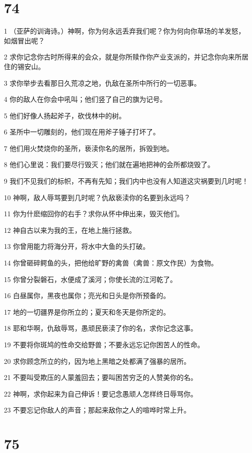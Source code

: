 \chapter{74}

\par 1 （亚萨的训诲诗。）神啊，你为何永远丢弃我们呢？你为何向你草场的羊发怒，如烟冒出呢？
\par 2 求你记念你古时所得来的会众，就是你所赎作你产业支派的，并记念你向来所居住的锡安山。
\par 3 求你举步去看那日久荒凉之地，仇敌在圣所中所行的一切恶事。
\par 4 你的敌人在你会中吼叫；他们竖了自己的旗为记号。
\par 5 他们好像人扬起斧子，砍伐林中的树。
\par 6 圣所中一切雕刻的，他们现在用斧子锤子打坏了。
\par 7 他们用火焚烧你的圣所，亵渎你名的居所，拆毁到地。
\par 8 他们心里说：我们要尽行毁灭；他们就在遍地把神的会所都烧毁了。
\par 9 我们不见我们的标帜，不再有先知；我们内中也没有人知道这灾祸要到几时呢！
\par 10 神啊，敌人辱骂要到几时呢？仇敌亵渎你的名要到永远吗？
\par 11 你为什麽缩回你的右手？求你从怀中伸出来，毁灭他们。
\par 12 神自古以来为我的王，在地上施行拯救。
\par 13 你曾用能力将海分开，将水中大鱼的头打破。
\par 14 你曾砸碎鳄鱼的头，把他给旷野的禽兽（禽兽：原文作民）为食物。
\par 15 你曾分裂磐石，水便成了溪河；你使长流的江河乾了。
\par 16 白昼属你，黑夜也属你；亮光和日头是你所预备的。
\par 17 地的一切疆界是你所立的；夏天和冬天是你所定的。
\par 18 耶和华啊，仇敌辱骂，愚顽民亵渎了你的名，求你记念这事。
\par 19 不要将你斑鸠的性命交给野兽；不要永远忘记你困苦人的性命。
\par 20 求你顾念所立的约，因为地上黑暗之处都满了强暴的居所。
\par 21 不要叫受欺压的人蒙羞回去；要叫困苦穷乏的人赞美你的名。
\par 22 神啊，求你起来为自己伸诉！要记念愚顽人怎样终日辱骂你。
\par 23 不要忘记你敌人的声音；那起来敌你之人的喧哗时常上升。

\chapter{75}


